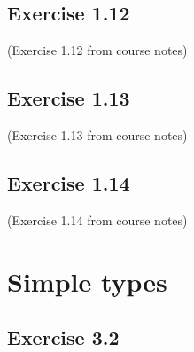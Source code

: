 \documentclass[12pt,a4paper,oneside]{book}
\begin{document}
\subsection{Exercise 1.12}

\begin{exercise}{(Exercise 1.12 from course notes)}
\end{exercise}

\subsection{Exercise 1.13}

\begin{exercise}{(Exercise 1.13 from course notes)}
\end{exercise}

\subsection{Exercise 1.14}

\begin{exercise}{(Exercise 1.14 from course notes)}
\end{exercise}

\section{Simple types}

\subsection{Exercise 3.2}
\end{document}
